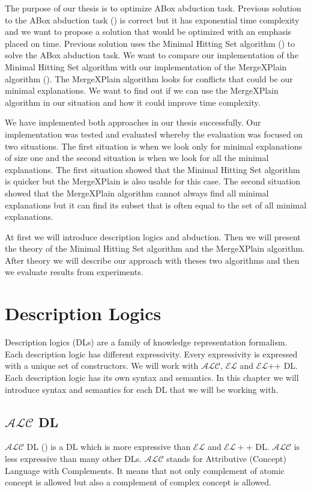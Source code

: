 \documentclass[12pt,a4paper]{article}
\begin{document}
The purpose of our thesis is to optimize ABox abduction task. Previous solution to the ABox abduction task (\cite{pukancovaPreliminaryReport}) is correct but it has exponential time complexity and we want to propose a solution that would be optimized with an emphasis placed on time. Previous solution uses the Minimal Hitting Set algorithm (\cite{reiterHS}) to solve the ABox abduction task. We want to compare our implementation of the Minimal Hitting Set algorithm with our implementation of the MergeXPlain algorithm (\cite{MXP}). The MergeXPlain algorithm looks for conflicts that could be our minimal explanations. We want to find out if we can use the MergeXPlain algorithm in our situation and how it could improve time complexity.

We have implemented both approaches in our thesis successfully. Our implementation was tested and evaluated whereby the evaluation was focused on two situations. The first situation is when we look only for minimal explanations of size one and the second situation is when we look for all the minimal explanations. The first situation showed that the Minimal Hitting Set algorithm is quicker but the MergeXPlain is also usable for this case. The second situation showed that the MergeXPlain algorithm cannot always find all minimal explanations but it can find its subset that is often equal to the set of all minimal explanations.

At first we will introduce description logics and abduction. Then we will present the theory of the Minimal Hitting Set algorithm and the MergeXPlain algorithm. After theory we will describe our approach with theses two algorithms and then we evaluate results from experiments.


\pagebreak
\section{Description Logics}
Description logics (DLs) are a family of knowledge representation formalism. Each description logic has different expressivity. Every expressivity is expressed with a unique set of constructors. We will work with $\mathcal{ALC}$, $\mathcal{EL}$ and $\mathcal{EL}${+}{+} DL. Each description logic has its own syntax and semantics. In this chapter we will introduce syntax and semantics \citep{Rudolph2011} for each DL that we will be working with.

\subsection{$\mathcal{ALC}$ DL}
$\mathcal{ALC}$ DL (\cite{schmidt1991attributive}) is a DL which is more expressive than $\mathcal{EL}$ and $\mathcal{EL}{+}{+}$ DL. $\mathcal{ALC}$ is less expressive than many other DLs. $\mathcal{ALC}$ stands for Attributive (Concept) Language with Complements. It means that not only complement of atomic concept is allowed but also a complement of complex concept is allowed.
\end{document}

